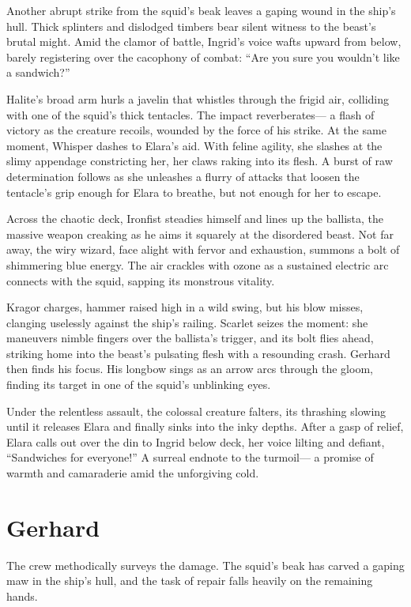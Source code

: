 \documentclass[
  letterpaper,12pt,twoside,twocolumn,openany,
  nodeprecatedcode,bg=full]{dndbook}
\begin{document}
Another abrupt strike from the squid's beak leaves a gaping wound in the
ship's hull. Thick splinters and dislodged timbers bear silent witness
to the beast's brutal might. Amid the clamor of battle, Ingrid's voice
wafts upward from below, barely registering over the cacophony of
combat: ``Are you sure you wouldn't like a sandwich?''

Halite's broad arm hurls a javelin that whistles through the frigid air,
colliding with one of the squid's thick tentacles. The impact
reverberates--- a flash of victory as the creature recoils, wounded by
the force of his strike. At the same moment, Whisper dashes to Elara's
aid. With feline agility, she slashes at the slimy appendage
constricting her, her claws raking into its flesh. A burst of raw
determination follows as she unleashes a flurry of attacks that loosen
the tentacle's grip enough for Elara to breathe, but not enough for her
to escape.

Across the chaotic deck, Ironfist steadies himself and lines up the
ballista, the massive weapon creaking as he aims it squarely at the
disordered beast. Not far away, the wiry wizard, face alight with fervor
and exhaustion, summons a bolt of shimmering blue energy. The air
crackles with ozone as a sustained electric arc connects with the squid,
sapping its monstrous vitality.

Kragor charges, hammer raised high in a wild swing, but his blow misses,
clanging uselessly against the ship's railing. Scarlet seizes the
moment: she maneuvers nimble fingers over the ballista's trigger, and
its bolt flies ahead, striking home into the beast's pulsating flesh
with a resounding crash. Gerhard then finds his focus. His longbow sings
as an arrow arcs through the gloom, finding its target in one of the
squid's unblinking eyes.

Under the relentless assault, the colossal creature falters, its
thrashing slowing until it releases Elara and finally sinks into the
inky depths. After a gasp of relief, Elara calls out over the din to
Ingrid below deck, her voice lilting and defiant, ``Sandwiches for
everyone!'' A surreal endnote to the turmoil--- a promise of warmth and
camaraderie amid the unforgiving cold.

\section{Gerhard}\label{gerhard}

The crew methodically surveys the damage. The squid's beak has carved a
gaping maw in the ship's hull, and the task of repair falls heavily on
the remaining hands.
\end{document}
